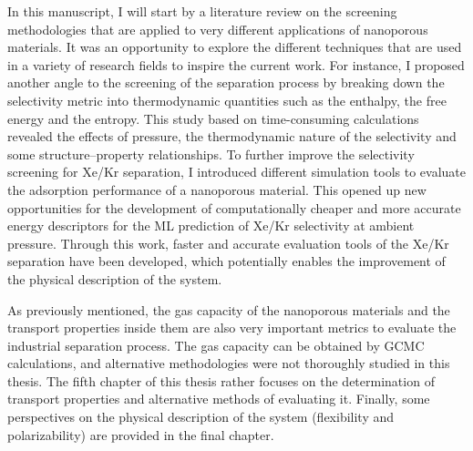 In this manuscript, I will start by a literature review on the screening methodologies that are applied to very different applications of nanoporous materials. It was an opportunity to explore the different techniques that are used in a variety of research fields to inspire the current work.\autocite{Ren_2022} For instance, I proposed another angle to the screening of the separation process by breaking down the selectivity metric into thermodynamic quantities such as the enthalpy, the free energy and the entropy. This study based on time-consuming calculations revealed the effects of pressure, the thermodynamic nature of the selectivity and some structure--property relationships.\autocite{Ren_2021} To further improve the selectivity screening for Xe/Kr separation, I introduced different simulation tools to evaluate the adsorption performance of a nanoporous material.\autocite{Ren_2023} This opened up new opportunities for the development of computationally cheaper and more accurate energy descriptors for the ML prediction of Xe/Kr selectivity at ambient pressure.\autocite{Ren_2023_ml} Through this work, faster and accurate evaluation tools of the Xe/Kr separation have been developed, which potentially enables the improvement of the physical description of the system. 

As previously mentioned, the gas capacity of the nanoporous materials and the transport properties inside them are also very important metrics to evaluate the industrial separation process. The gas capacity can be obtained by GCMC calculations, and alternative methodologies were not thoroughly studied in this thesis. The fifth chapter of this thesis rather focuses on the determination of transport properties and alternative methods of evaluating it. Finally, some perspectives on the physical description of the system (flexibility and polarizability) are provided in the final chapter.


\vfill
\begin{center}
\end{center}
\vfill\vfill